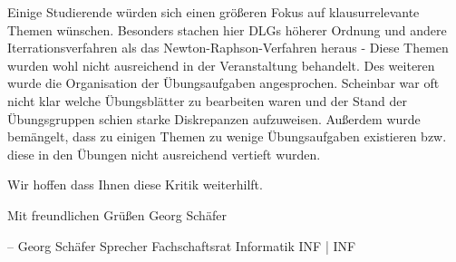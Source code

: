 \documentclass[a4paper, 11pt]{article} %
\begin{document}
\begin{spverbatim}
Einige Studierende würden sich einen größeren Fokus auf klausurrelevante 
Themen wünschen. Besonders stachen hier DLGs höherer Ordnung und andere 
Iterrationsverfahren als das Newton-Raphson-Verfahren heraus - Diese 
Themen wurden wohl nicht ausreichend in der Veranstaltung behandelt. 
Des weiteren wurde die Organisation der Übungsaufgaben angesprochen. 
Scheinbar war oft nicht klar welche Übungsblätter zu bearbeiten waren 
und der Stand der Übungsgruppen schien starke Diskrepanzen aufzuweisen. 
Außerdem wurde bemängelt, dass zu einigen Themen zu wenige 
Übungsaufgaben existieren bzw. diese in den Übungen nicht ausreichend 
vertieft wurden. 

Wir hoffen dass Ihnen diese Kritik weiterhilft. 

Mit freundlichen Grüßen 
Georg Schäfer 

--  
Georg Schäfer 
Sprecher Fachschaftsrat Informatik 
INF | INF 

\end{spverbatim}
\end{document}

